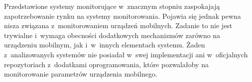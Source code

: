 Przedstawione systemy monitorujące w~znacznym stopniu zaspokajają
zapotrzebowanie rynku na systemy monitorowania. Pojawia się jednak
pewna nisza związana z~monitorowaniem urządzeń mobilnych. Zadanie to
nie jest trywialne i~wymaga obecności dodatkowych mechanizmów zarówno
na urządzeniu mobilnym, jak i~w~innych elementach systemu. Żaden
z~analizowanych systemów nie posiadał w~swej implementacji ani
w~oficjalnych repozytoriach z~dodatkami oprogramowania, które
pozwalałoby na monitorowanie parametrów urządzenia mobilnego.

